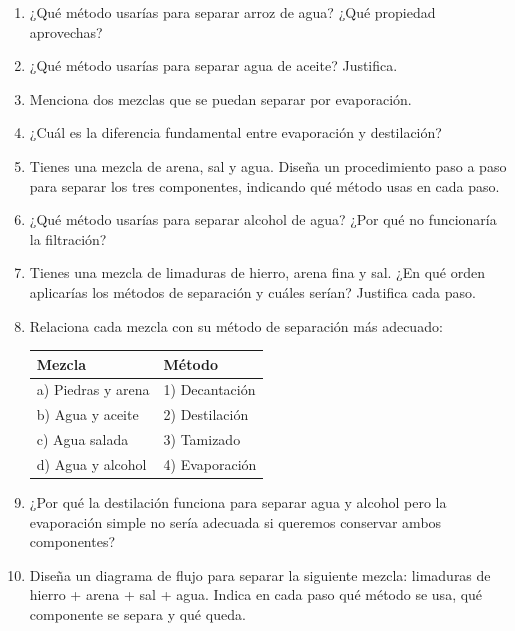 \documentclass[12pt, a4paper]{article}
\begin{document}
\begin{enumerate}[leftmargin=*, resume]
  \item \facil{} ¿Qué método usarías para separar arroz de agua? ¿Qué propiedad aprovechas?

  \item \facil{} ¿Qué método usarías para separar agua de aceite? Justifica.

  \item \facil{} Menciona dos mezclas que se puedan separar por evaporación.

  \item \facil{} ¿Cuál es la diferencia fundamental entre evaporación y destilación?

  \item \medio{} Tienes una mezcla de arena, sal y agua. Diseña un procedimiento paso a paso para separar los tres componentes, indicando qué método usas en cada paso.

  \item \medio{} ¿Qué método usarías para separar alcohol de agua? ¿Por qué no funcionaría la filtración?

  \item \medio{} Tienes una mezcla de limaduras de hierro, arena fina y sal. ¿En qué orden aplicarías los métodos de separación y cuáles serían? Justifica cada paso.

  \item \medio{} Relaciona cada mezcla con su método de separación más adecuado:
  \begin{center}
  \small
  \begin{tabular}{ll}
  \toprule
  \textbf{Mezcla} & \textbf{Método} \\
  \midrule
  a) Piedras y arena & 1) Decantación \\
  b) Agua y aceite & 2) Destilación \\
  c) Agua salada & 3) Tamizado \\
  d) Agua y alcohol & 4) Evaporación \\
  \bottomrule
  \end{tabular}
  \end{center}

  \item \dificil{} ¿Por qué la destilación funciona para separar agua y alcohol pero la evaporación simple no sería adecuada si queremos conservar ambos componentes?

  \item \dificil{} Diseña un diagrama de flujo para separar la siguiente mezcla: limaduras de hierro + arena + sal + agua. Indica en cada paso qué método se usa, qué componente se separa y qué queda.


\end{enumerate}
\end{document}
